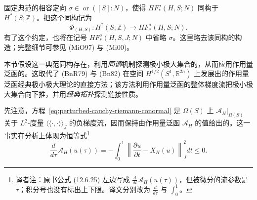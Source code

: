 \section{\termLagrangianSpectralInvariant{}}
\label{sec:lagrangian-spectral-invariants}

固定典范的相容定向 $\sigma\in\operatorname{or}([S]:N)$，使得 $HF_*^\sigma(H,S;N)$ 同构于\termSingularCohomology{} $H^*(S;\mathbb Z)$。把这个同构记为
\[
  \Phi_{(H,S)}:H^*(S;\mathbb Z)
  \longrightarrow HF_*^\sigma(H,S;N).
\]
有了这个约定，也将在记号 $HF_*^\sigma(H,S,J;N)$ 中省略 $\sigma$。这里略去该同构的构造；完整细节可参见 (MiO97) 与 (Mi00)。

本节假设这一典范同构存在，利用\emph{\personFloer{}同调}机制探测极小极大集合的\termLinkingProperty{}，从而应用作用量泛函的\termMinimaxTheory{}。这取代了 (BnR79) 与 (Bn82) 在\personSobolev{}空间 $H^{1/2}(S^1,\mathbb R^{2n})$ 上发展出的作用量泛函经典极小极大理论的直接方法；该方法利用作用量泛函的整体梯度流把极小极大集合向下推，并用\emph{经典拓扑}探测链接性质。

先注意，方程~\eqref{eq:perturbed-cauchy-riemann-conormal} 是 $\Omega(S)$ 上 $\mathcal A_H|_{\Omega(S)}$ 关于 $L^2$-度量 $\langle\!\langle\mathord\cdot,\mathord\cdot\rangle\!\rangle_J$ 的负梯度流，因而保持由作用量泛函 $\mathcal A_H$ 的值给出的\termDownwardFiltration{}。这一事实在分析上体现为恒等式\footnote{译者注：原书公式 (12.6.25) 左边写成 $\frac d{dt}\mathcal A_H(u(\tau))$，但被微分的流参数是 $\tau$；积分号也没有标出上下限。译文分别改为 $\frac d{d\tau}$ 与 $\int_0^1$。}
\begin{equation}
  \frac d{d\tau}\mathcal A_H(u(\tau))
  =-\int_0^1
    \left\lVert\frac{\partial u}{\partial t}-X_H(u)\right\rVert_J^2dt
  \le0.
\label{eq:action-decreases-along-floer-flow}
\end{equation}

